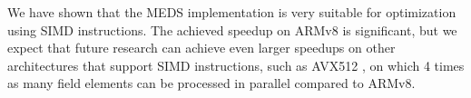 \documentclass[11pt,a4paper]{report}
\theoremstyle{definition}
\begin{document}
We have shown that the MEDS implementation is very suitable for optimization using SIMD instructions. The achieved speedup on ARMv8 is significant, but we expect that future research can achieve even larger speedups on other architectures that support SIMD instructions, such as AVX512 \cite{intel-avx512}, on which 4 times as many field elements can be processed in parallel compared to ARMv8.





\appendix


\end{document}
